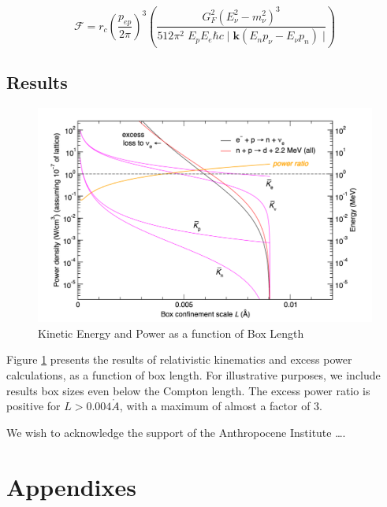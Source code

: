 \documentclass[%
 aip,
 jmp,%
 amsmath,amssymb,
 reprint,%
]{revtex4-1}
\begin{document}
$$\mathcal{F}=r_{c}\left(\dfrac{p_{ep}}{2\pi}\right)^{3}\left(\dfrac{G_{F}^{2}(E_{\nu}^{2}-m_{\nu}^{2})^{3}}{512\pi^{2}\;E_{p}E_{e}\hbar c\;\big\vert\; \mathbf{k}(E_{n}p_{\nu}-E_{\nu}p_{n})\;\big\vert}\right)$$

\subsection{Results}



\begin{figure}
 \begin{minipage}{\linewidth}
   \includegraphics[scale=0.5]{img/results.png}
   \caption{Kinetic Energy and Power as a function of Box Length}
  \label{fig:results}
\end{minipage}
\end{figure}


Figure \ref{fig:results} presents the results of relativistic kinematics and excess power calculations, as a function of box length.
For illustrative purposes, we include results box sizes even below the Compton length.  The excess power ratio is positive for $L>0.004\mathring{A}$, with a maximum of almost a factor of 3.






\begin{acknowledgments}
We wish to acknowledge the support of the Anthropocene Institute
\dots.
\end{acknowledgments}

\appendix

\section{Appendixes}
\end{document}
